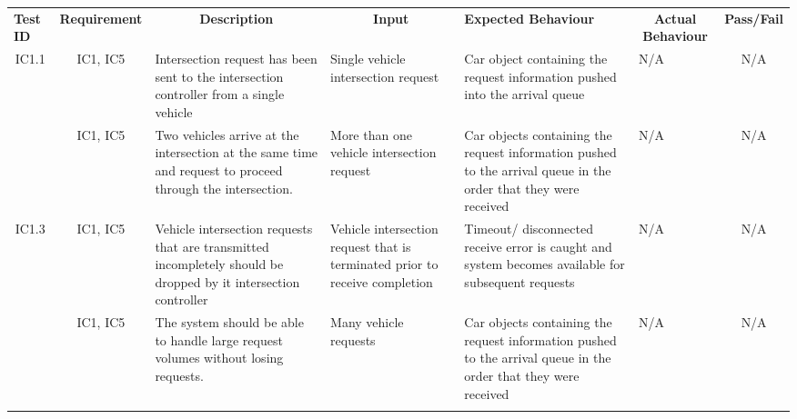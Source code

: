 \documentclass [10pt]{article}
\begin{document}
  \begin{longtable}{ | p{ } | p{ } |  p{ } |  p{ } | p{ } | p{ } |  p{ } |}  \hline

    \rowcolor{subsectionC}\textbf{Test ID}
    & \multicolumn{1}{c|}{\textbf{Requirement} }
    &\multicolumn{1}{c|}{\textbf{Description} }
    & \multicolumn{1}{c|}{\textbf{Input} }
    & \textbf{Expected Behaviour} 
    & \multicolumn{1}{c|}{\textbf{Actual Behaviour} }
    & \multicolumn{1}{c|}{\textbf{Pass/Fail}} \\  
    
    \multicolumn{1}{|c|}{IC1.1} 
    & \multicolumn{1}{c|}{IC1, IC5}
    & Intersection request has been sent to the intersection controller from a single vehicle
    & Single vehicle intersection request 
    & Car object containing the request information pushed into the arrival queue
    & N/A
    & \multicolumn{1}{|c|}{N/A}\\ 
    \rowcolor{tableCell}\multicolumn{1}{|c|}{IC1.2} 
    & \multicolumn{1}{c|}{IC1, IC5}
    & Two vehicles arrive at the intersection at the same time and request to proceed through the intersection. 
    & More than one vehicle intersection request 
    & Car objects containing the request information pushed to the arrival queue in the order that they were received 
    & N/A
    & \multicolumn{1}{|c|}{N/A}\\ 
    
    \multicolumn{1}{|c|}{IC1.3} 
    & \multicolumn{1}{c|}{IC1, IC5}
    & Vehicle intersection requests that are transmitted incompletely should be dropped by it intersection controller
    &  Vehicle intersection request that is terminated prior to receive completion
    & Timeout/ disconnected receive error is caught and system becomes available for subsequent requests
    & N/A
    & \multicolumn{1}{|c|}{N/A}\\ \hline 
    
    
    
  
  
    
    \rowcolor{tableCell}\multicolumn{1}{|c|}{IC1.4} 
    & \multicolumn{1}{c|}{IC1, IC5}
    & The system should be able to handle large request volumes without losing requests. 
    & Many vehicle requests
    &  Car objects containing the request information pushed to the arrival queue in the order that they were received 
    & N/A
    & \multicolumn{1}{|c|}{N/A}\\ \hline
    \newpage \hline



\end{longtable}
\end{document}

